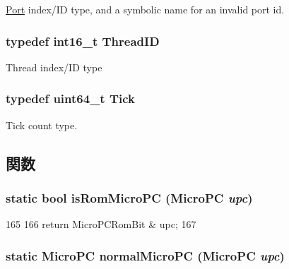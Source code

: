 \label{base_2types_8hh_acef4d7d41cb21fdc252e20c04cd7bb8e}
\hyperlink{classPort}{Port} index/ID type, and a symbolic name for an invalid port id. \hypertarget{base_2types_8hh_ab39b1a4f9dad884694c7a74ed69e6a6b}{
\subsubsection[{ThreadID}]{\setlength{\rightskip}{0pt plus 5cm}typedef int16\_\-t {\bf ThreadID}}}
\label{base_2types_8hh_ab39b1a4f9dad884694c7a74ed69e6a6b}
Thread index/ID type \hypertarget{base_2types_8hh_a5c8ed81b7d238c9083e1037ba6d61643}{
\subsubsection[{Tick}]{\setlength{\rightskip}{0pt plus 5cm}typedef uint64\_\-t {\bf Tick}}}
\label{base_2types_8hh_a5c8ed81b7d238c9083e1037ba6d61643}
Tick count type. 

\subsection{関数}
\hypertarget{base_2types_8hh_a01ec7071d9749218cc83949b3f93cd9b}{
\subsubsection[{isRomMicroPC}]{\setlength{\rightskip}{0pt plus 5cm}static bool isRomMicroPC ({\bf MicroPC} {\em upc})}}
\label{base_2types_8hh_a01ec7071d9749218cc83949b3f93cd9b}



\begin{DoxyCode}
165 {
166     return MicroPCRomBit & upc;
167 }
\end{DoxyCode}
\hypertarget{base_2types_8hh_aef03c1e44f1929d58fb5ac37bfda39b9}{
\subsubsection[{normalMicroPC}]{\setlength{\rightskip}{0pt plus 5cm}static {\bf MicroPC} normalMicroPC ({\bf MicroPC} {\em upc})}}
\label{base_2types_8hh_aef03c1e44f1929d58fb5ac37bfda39b9}



